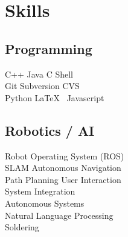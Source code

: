 \documentclass[a4paper]{awesome-deedy}
\begin{document}
\begin{minipage}[t]{0.33\textwidth}




\section{Skills}
\subsection{Programming}
C++ \textbullet{} Java \textbullet{} C \textbullet{} Shell \\
Git \textbullet{} Subversion \textbullet{} CVS \\
Python \textbullet{} \LaTeX\ \textbullet{} Javascript \\
\sectionsep

\subsection{Robotics / AI}
Robot Operating System (ROS) \\
SLAM \textbullet{} Autonomous Navigation \\
Path Planning \textbullet{} User Interaction \\
System Integration \\
Autonomous Systems\\
Natural Language Processing \\
Soldering \\
\sectionsep


\end{minipage}
\end{document}
